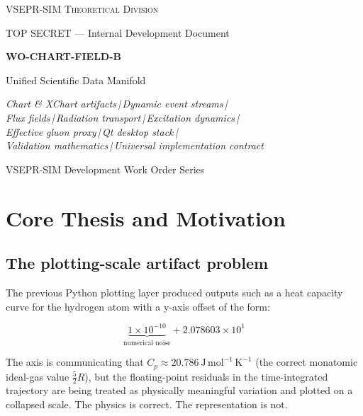 \documentclass[11pt, a4paper, oneside]{article}
\begin{document}
\begin{titlepage}
  \centering
  \vspace*{1.2cm}
  {\large\scshape VSEPR-SIM Theoretical Division\par}
  \vspace{0.3cm}
  {\small TOP SECRET --- Internal Development Document\par}
  \vspace{1.2cm}
  {\Huge\bfseries WO-CHART-FIELD-B\par}
  \vspace{0.4cm}
  {\LARGE Unified Scientific Data Manifold\par}
  \vspace{0.8cm}
  {\large\itshape
    Chart \& XChart artifacts\,|\,Dynamic event streams\,|\,\\[0.3em]
    Flux fields\,|\,Radiation transport\,|\,Excitation dynamics\,|\,\\[0.3em]
    Effective gluon proxy\,|\,Qt desktop stack\,|\,\\[0.3em]
    Validation mathematics\,|\,Universal implementation contract\par}
  \vspace{1.4cm}
  {\normalsize VSEPR-SIM Development Work Order Series\par}
\end{titlepage}

\tableofcontents
\newpage

\section{Core Thesis and Motivation}
\label{sec:thesis}

\subsection{The plotting-scale artifact problem}

The previous Python plotting layer produced outputs such as a heat capacity
curve for the hydrogen atom with a y-axis offset of the form:

\[
  \underbrace{1 \times 10^{-10}}_{\text{numerical noise}} + 2.078603 \times 10^{1}
\]

The axis is communicating that $C_p \approx 20.786\ \mathrm{J\,mol^{-1}\,K^{-1}}$
(the correct monatomic ideal-gas value $\frac{5}{2}R$), but the floating-point
residuals in the time-integrated trajectory are being treated as physically
meaningful variation and plotted on a collapsed scale. The physics is correct.
The representation is not.
\end{document}
